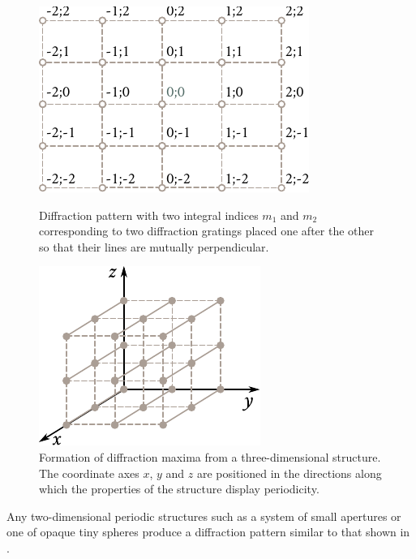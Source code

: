 \begin{figure}[t]
	\begin{minipage}[t]{0.48\linewidth}
		\begin{center}
			\includegraphics[scale=1]{figures/ch_18/fig_18_39.pdf}
            \caption[]{Diffraction pattern with two integral indices $m_1$ and $m_2$ corresponding to two diffraction gratings placed one after the other so that their lines are mutually perpendicular.}
			\label{fig:18_39}
		\end{center}
	\end{minipage}
	\hfill{ }%
	\begin{minipage}[t]{0.48\linewidth}
		\begin{center}
			\includegraphics[scale=1]{figures/ch_18/fig_18_40.pdf}
			\caption[]{Formation of diffraction maxima from a three-dimensional structure. The coordinate axes $x$, $y$ and $z$ are positioned in the directions along which the properties of the structure display periodicity.}
			\label{fig:18_40}
		\end{center}
	\end{minipage}
\vspace{-0.4cm}
\end{figure}

Any two-dimensional periodic structures such as a system of small apertures or one of opaque tiny spheres produce a diffraction pattern similar to that shown in .

